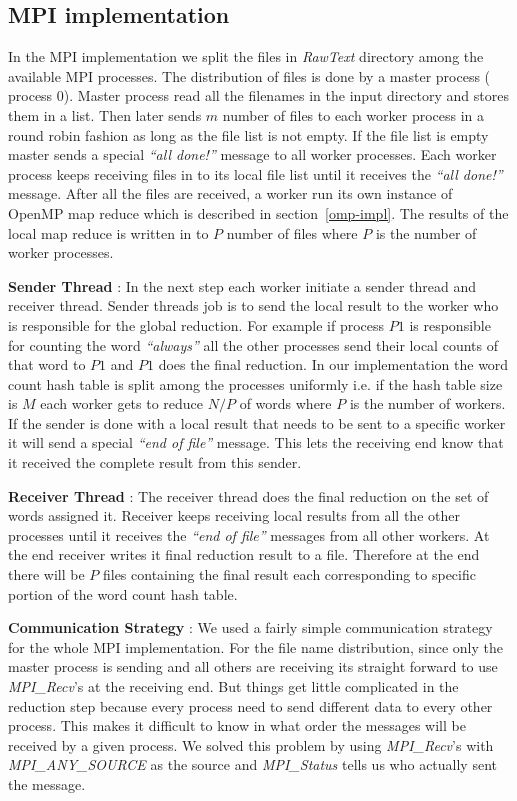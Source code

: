 \documentclass[12pt]{article}
\begin{document}
\label{omp-impl}
\subsection{MPI implementation}
In the MPI implementation we split the files in {\em RawText } directory among the available MPI processes. The distribution of files is done by a master process ( process $0$).
Master process read all the filenames in the input directory and stores them in a list. Then later sends $m$  number of files to each worker process in a round robin fashion as long as the file
list is not empty. If the file list is empty master sends a special {\em ``all done!''} message to all worker processes. Each worker process keeps receiving files in to its local file list until
it receives the {\em``all done!''} message. After all the files are received, a worker run its own instance of OpenMP map reduce which is described in section~\ref{omp-impl}. The results of the
local map reduce is written in to $P$ number of files where $P$ is the number of worker processes. 

\noindent \textbf{Sender Thread} : In the next step each worker initiate a sender thread and receiver thread. Sender threads job is
to send the local result to the worker who is responsible for the global reduction. For example if process $P1$ is responsible for counting the word {\em ``always''} all the other processes send their
local counts of that word to $P1$ and $P1$ does the final reduction. In our implementation the word count hash table is split among the processes uniformly i.e. if the hash table size is $M$ each worker gets 
to reduce $N/P$ of words where $P$ is the number of workers. If the sender is done with a local result that needs to be sent to a specific worker it will send a special {\em ``end of file''} message. This
lets the receiving end know that it received the complete result from this sender. 

\noindent \textbf{Receiver Thread} : The receiver thread does the final reduction on the set of words assigned it. Receiver keeps receiving local results from all the other processes until it 
receives the {\em ``end of file''} messages from all 
other workers. At the end receiver writes it final reduction result to a file. Therefore at the end there will be $P$ files containing the final result each corresponding to specific portion of the word 
count hash table. 

\noindent \textbf{Communication Strategy} : We used a fairly simple communication strategy for the whole MPI implementation. For the file name distribution, since only the master process is sending and all others are 
receiving its straight forward to use {\em MPI\_Recv}'s at the receiving end. But things get little complicated in the reduction step because every process need to send different data to every other process. This makes 
it difficult to know in what order the messages will be received by a given process. We solved this problem by using {\em MPI\_Recv}'s with {\em MPI\_ANY\_SOURCE} as the source and {\em MPI\_Status} tells us who actually sent 
the message.
\end{document}
